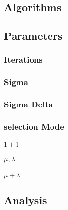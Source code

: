 \documentclass{scrartcl}
\begin{document}
\subsection{Algorithms}


\subsection{Parameters}
\subsubsection{Iterations}
\subsubsection{Sigma} 
\subsubsection{Sigma Delta}

\subsubsection{selection Mode}
\paragraph{$1+1$}

\paragraph{$\mu,\lambda$}

\paragraph{$\mu +\lambda$}


\subsection{Analysis}
\end{document}
